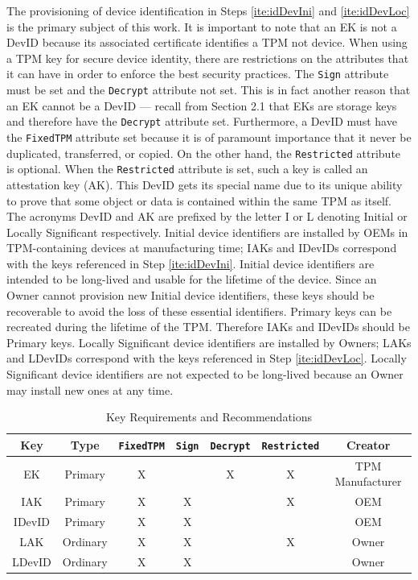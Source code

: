 \documentclass[runningheads]{llncs}
\begin{document}
The provisioning of device identification in Steps \ref{ite:idDevIni} and \ref{ite:idDevLoc} is the primary subject of this work. It is important to note that an EK is not a DevID because its associated certificate identifies a TPM not device. When using a TPM key for secure device identity, there are restrictions on the attributes that it can have in order to enforce the best security practices. The \verb|Sign| attribute must be set and the \verb|Decrypt| attribute not set. This is in fact another reason that an EK cannot be a DevID --- recall from Section 2.1 that EKs are storage keys and therefore have the \verb|Decrypt| attribute set. Furthermore, a DevID must have the \verb|FixedTPM| attribute set because it is of paramount importance that it never be duplicated, transferred, or copied. On the other hand, the \verb|Restricted| attribute is optional. When the \verb|Restricted| attribute is set, such a key is called an attestation key (AK). This DevID gets its special name due to its unique ability to prove that some object or data is contained within the same TPM as itself. The acronyms DevID and AK are prefixed by the letter I or L denoting Initial or Locally Significant respectively. Initial device identifiers are installed by OEMs in TPM-containing devices at manufacturing time; IAKs and IDevIDs correspond with the keys referenced in Step \ref{ite:idDevIni}. Initial device identifiers are intended to be long-lived and usable for the lifetime of the device. Since an Owner cannot provision new Initial device identifiers, these keys should be recoverable to avoid the loss of these essential identifiers. Primary keys can be recreated during the lifetime of the TPM. Therefore IAKs and IDevIDs should be Primary keys. Locally Significant device identifiers are installed by Owners; LAKs and LDevIDs correspond with the keys referenced in Step \ref{ite:idDevLoc}. Locally Significant device identifiers are not expected to be long-lived because an Owner may install new ones at any time. 

\begin{table}[h]
  \begin{center}
    \scriptsize 
    \sffamily
    \renewcommand{\arraystretch}{1.5}
    \begin{tabular}{ |c|c|c|c|c|c|c| }
      \hline
      Key & Type & \verb|FixedTPM| & \verb|Sign| & \verb|Decrypt| & \verb|Restricted| & Creator \\
      \hline
      \hline
      EK & Primary       & X &   & X & X & TPM Manufacturer \\
      \hline
      IAK & Primary      & X & X &   & X & OEM \\
      \hline
      IDevID & Primary   & X & X &   &   & OEM \\
      \hline
      LAK & Ordinary     & X & X &   & X & Owner \\
      \hline
      LDevID & Ordinary  & X & X &   &   & Owner \\
      \hline
    \end{tabular}
    \caption{Key Requirements and Recommendations}
    \label{fig:req_and_recs}
  \end{center}
\end{table}
\end{document}
